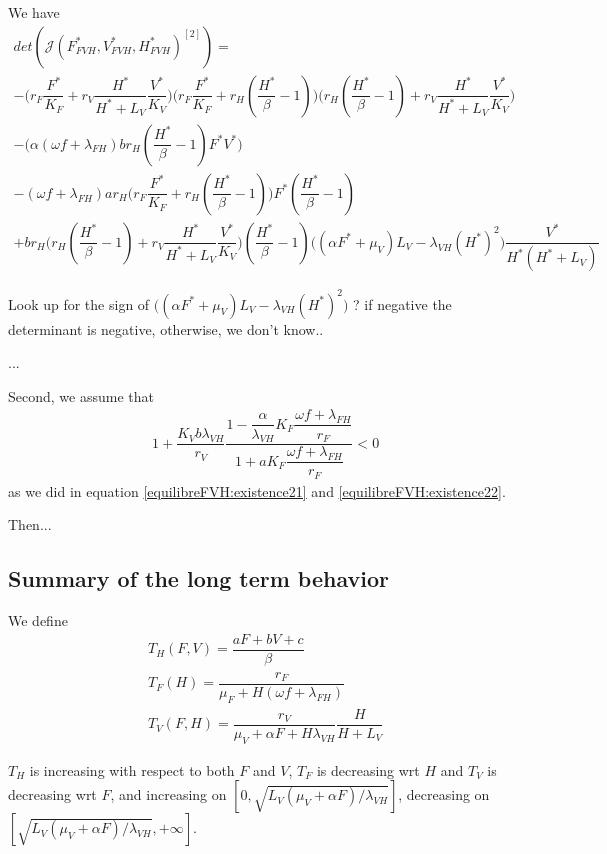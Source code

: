 \documentclass{article}
\newcommand{\lf}{\lambda_{FH}}
\newcommand{\lv}{\lambda_{VH}}
\newcommand{\FHterme}{\omega f + \lf}
\begin{document}
\begin{itemize}
We have
\begin{multline}
det(\mathcal{J}(F^*_{FVH}, V^*_{FVH}, H^*_{FVH})^{[2]}) = \\ -\Big(r_F \dfrac{F^*}{K_F} + r_V \dfrac{H^*}{H^*+L_V}\dfrac{V^*}{K_V}\Big)\Big(r_F \dfrac{F^*}{K_F} + r_H(\dfrac{H^*}{\beta}-1)\Big)\Big(r_H(\dfrac{H^*}{\beta}-1) + r_V \dfrac{H^*}{H^*+L_V}\dfrac{V^*}{K_V}\Big) \\
-\Big(\alpha(\FHterme)br_H (\dfrac{H^*}{\beta}-1) F^* V^* \Big) \\
- (\FHterme)  ar_H \Big(r_F \dfrac{F^*}{K_F} + r_H(\dfrac{H^*}{\beta}-1)\Big) F^* (\dfrac{H^*}{\beta}-1) \\
+ br_H \Big(r_H(\dfrac{H^*}{\beta}-1) + r_V \dfrac{H^*}{H^*+L_V}\dfrac{V^*}{K_V}\Big) (\dfrac{H^*}{\beta}-1) \Big((\alpha F^* + \mu_V) L_V - \lv (H^*)^2\Big) \dfrac{V^*}{H^*(H^*+L_V)}
\end{multline}

Look up for the sign of $\Big((\alpha F^* + \mu_V) L_V - \lv (H^*)^2\Big)$ ? if negative the determinant is negative, otherwise, we don't know..

...

Second, we assume that
\begin{subequations}
\begin{align}
& 1  +\dfrac{K_Vb\lv}{r_V}\dfrac{1- \dfrac{\alpha}{\lv} K_F \dfrac{\FHterme}{r_F}}{1 + a K_F\dfrac{\FHterme}{r_F}}  < 0
\end{align}
\end{subequations} as we did in equation \eqref{equilibreFVH:existence21} and \eqref{equilibreFVH:existence22}.

Then...

\end{itemize}

\subsection{Summary of the long term behavior}
We define 
\begin{subequations}
\begin{align}
& T_H(F, V) = \dfrac{aF + bV + c}{\beta} \\
& T_F(H) = \dfrac{r_F}{\mu_F + H (\omega f + \lf)} \\
& T_V(F, H) = \dfrac{r_V}{\mu_V + \alpha F + H \lv} \dfrac{H}{H + L_V}
\end{align}
\end{subequations}

$T_H$ is increasing with respect to both $F$ and $V$, $T_F$ is decreasing wrt $H$ and $T_V$ is decreasing wrt $F$, and increasing on $[0, \sqrt{L_V (\mu_V + \alpha F) /\lv}]$, decreasing on $[\sqrt{L_V (\mu_V + \alpha F) /\lv}, +\infty]$.
\end{document}
